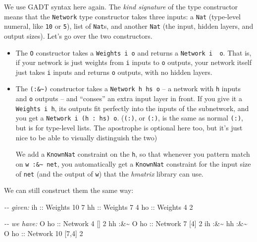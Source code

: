 \documentclass[]{article}
\newenvironment{Shaded}{}{}
\newcommand{\CommentTok}[1]{\textcolor[rgb]{0.38,0.63,0.69}{\textit{#1}}}
\newcommand{\DataTypeTok}[1]{\textcolor[rgb]{0.56,0.13,0.00}{#1}}
\newcommand{\DecValTok}[1]{\textcolor[rgb]{0.25,0.63,0.44}{#1}}
\newcommand{\NormalTok}[1]{#1}
\newcommand{\OperatorTok}[1]{\textcolor[rgb]{0.40,0.40,0.40}{#1}}
\newcommand{\OtherTok}[1]{\textcolor[rgb]{0.00,0.44,0.13}{#1}}
\begin{document}
We use GADT syntax here again. The \emph{kind signature} of the type constructor
means that the \texttt{Network} type constructor takes three inputs: a
\texttt{Nat} (type-level numeral, like \texttt{10} or \texttt{5}), list of
\texttt{Nat}s, and another \texttt{Nat} (the input, hidden layers, and output
sizes). Let's go over the two constructors.

\begin{itemize}
\item
  The \texttt{O} constructor takes a \texttt{Weights\ i\ o} and returns a
  \texttt{Network\ i\ \textquotesingle{}{[}{]}\ o}. That is, if your network is
  just weights from \texttt{i} inputs to \texttt{o} outputs, your network itself
  just takes \texttt{i} inputs and returns \texttt{o} outputs, with no hidden
  layers.
\item
  The \texttt{(:\&\textasciitilde{})} constructor takes a
  \texttt{Network\ h\ hs\ o} -- a network with \texttt{h} inputs and \texttt{o}
  outputs -- and ``conses'' an extra input layer in front. If you give it a
  \texttt{Weights\ i\ h}, its outputs fit perfectly into the inputs of the
  subnetwork, and you get a
  \texttt{Network\ i\ (h\ \textquotesingle{}:\ hs)\ o}.
  (\texttt{(\textquotesingle{}:)}, or \texttt{(:)}, is the same as normal
  \texttt{(:)}, but is for type-level lists. The apostrophe is optional here
  too, but it's just nice to be able to visually distinguish the two)

  We add a \texttt{KnownNat} constraint on the \texttt{h}, so that whenever you
  pattern match on \texttt{w\ :\&\textasciitilde{}\ net}, you automatically get
  a \texttt{KnownNat} constraint for the input size of \texttt{net} (and the
  output of \texttt{w}) that the \emph{hmatrix} library can use.
\end{itemize}

We can still construct them the same way:

\begin{Shaded}
\begin{Highlighting}[]
\CommentTok{{-}{-} given:}
\OtherTok{ih ::} \DataTypeTok{Weights} \DecValTok{10} \DecValTok{7}
\OtherTok{hh ::} \DataTypeTok{Weights}  \DecValTok{7} \DecValTok{4}
\OtherTok{ho ::} \DataTypeTok{Weights}  \DecValTok{4} \DecValTok{2}

\CommentTok{{-}{-} we have:}
              \DataTypeTok{O}\OtherTok{ ho ::} \DataTypeTok{Network}  \DecValTok{4}\NormalTok{ \textquotesingle{}[] }\DecValTok{2}
\NormalTok{       hh }\OperatorTok{:\&\textasciitilde{}} \DataTypeTok{O}\OtherTok{ ho ::} \DataTypeTok{Network}  \DecValTok{7}\NormalTok{ \textquotesingle{}[}\DecValTok{4}\NormalTok{] }\DecValTok{2}
\NormalTok{ih }\OperatorTok{:\&\textasciitilde{}}\NormalTok{ hh }\OperatorTok{:\&\textasciitilde{}} \DataTypeTok{O}\OtherTok{ ho ::} \DataTypeTok{Network} \DecValTok{10}\NormalTok{ \textquotesingle{}[}\DecValTok{7}\NormalTok{,}\DecValTok{4}\NormalTok{] }\DecValTok{2}
\end{Highlighting}
\end{Shaded}
\end{document}
